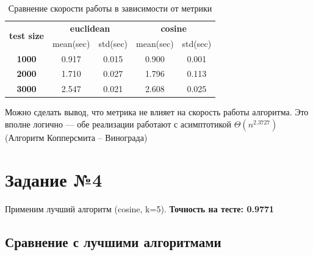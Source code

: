 \documentclass[12pt,fleqn]{article}
\begin{document}
\begin{table}[htb]
    \centering
    \begin{tabular}{|c|c|c|c|c|}
    \hline
    \multirow{2}{*}{\textbf{test size}} & \multicolumn{2}{c|}{\textbf{euclidean}} & \multicolumn{2}{c|}{\textbf{cosine}} \\ \cline{2-5} 
                                        & mean(sec)           & std(sec)          & mean(sec)         & std(sec)         \\ \hline
    \textbf{1000}                       & 0.917               & 0.015             & 0.900             & 0.001            \\ \hline
    \textbf{2000}                       & 1.710               & 0.027             & 1.796             & 0.113            \\ \hline
    \textbf{3000}                       & 2.547               & 0.021             & 2.608             & 0.025           \\ \hline
    \end{tabular}
    \caption{Сравнение скорости работы в зависимости от метрики}
\end{table}

Можно сделать вывод, что метрика не влияет на скорость работы алгоритма. Это вполне логично ---
 обе реализации работают с асимптотикой $\Theta(n^{2.3727})$ (Алгоритм Копперсмита -- Винограда)

\section{Задание №4}
Применим лучший алгоритм (cosine, k=5).
\textbf{Точность на тесте: 0.9771}

\subsection{Сравнение с лучшими алгоритмами}
\end{document}
